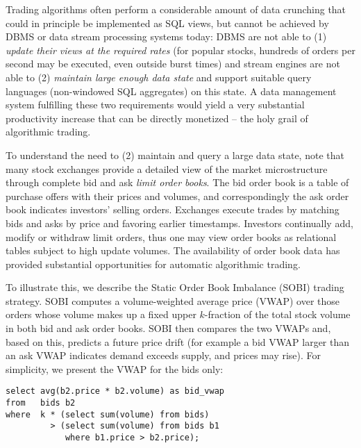 Trading algorithms often perform a considerable amount of data crunching that
could in principle be implemented as SQL views, but cannot be achieved by DBMS
or data stream processing systems today: DBMS are not able to (1) {\em update
their views at the required rates}\/ (for popular stocks, hundreds of orders per
second may be executed, even outside burst times) and stream engines are not
able to (2) {\em maintain large enough data state}\/ and support suitable query
languages (non-windowed SQL aggregates) on this state.
A data management system fulfilling these two requirements would yield a very
substantial productivity increase that can be directly monetized -- the holy
grail of algorithmic trading.



To understand the need to (2) maintain and query a large data state, note that
many stock exchanges provide a detailed view of the market microstructure
through complete bid and ask {\em limit order books}. The bid order book is a
table of purchase offers with their prices and volumes, and correspondingly the
ask order book indicates investors' selling orders. Exchanges execute trades by
matching bids and asks by price and favoring earlier timestamps. Investors
continually add, modify or withdraw limit orders, thus one may view order books
as relational tables subject to high update volumes. The availability of order
book data has provided substantial opportunities for automatic algorithmic
trading.





To illustrate this, we describe the Static Order Book Imbalance (SOBI) trading
strategy. SOBI computes a volume-weighted average price (VWAP) over those orders
whose volume makes up a fixed upper $k$-fraction of the total stock volume in
both bid and ask order books. SOBI then compares the two VWAPs and, based on
this, predicts a future price drift (for example a bid VWAP larger than an ask
VWAP indicates demand exceeds supply, and prices may rise). For simplicity, we
present the VWAP for the bids only:



\begin{verbatim}
select avg(b2.price * b2.volume) as bid_vwap
from   bids b2
where  k * (select sum(volume) from bids)
         > (select sum(volume) from bids b1
            where b1.price > b2.price);
\end{verbatim}


